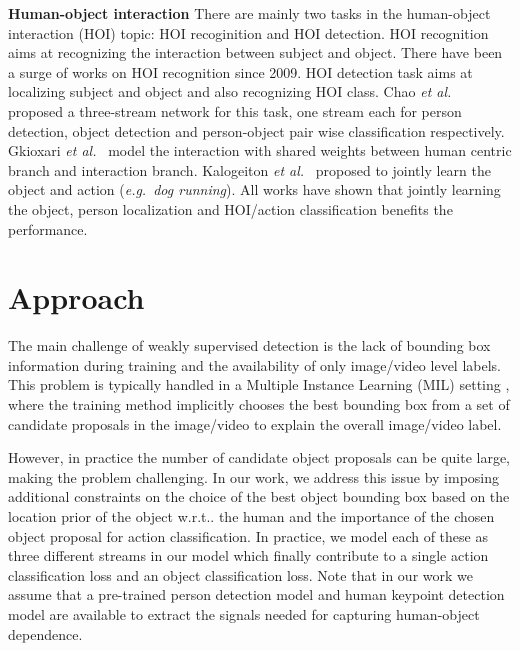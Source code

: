 \documentclass[10pt,twocolumn,letterpaper]{article}
\makeatletter
\DeclareRobustCommand\onedot{\futurelet\@let@token\@onedot}
\def\onedot{\ifx\@let@token.\else.\null\fi\xspace}
\def\eg{\emph{e.g.}}
\def\wrt{w.r.t\onedot}
\def\etal{\emph{et al.}}
\makeatother
\begin{document}
\textbf{Human-object interaction}
There are mainly two tasks in the human-object interaction (HOI) topic: HOI recoginition and HOI detection. HOI recognition aims at recognizing the interaction between subject and object. There have been a surge of works \cite{delaitre2010recognizing,gupta2009observing,yao2010modeling,shen2018scaling} on HOI recognition since 2009.
HOI detection task aims at localizing subject and object and also recognizing HOI class. Chao \etal~\cite{chao2018learning} proposed a three-stream network for this task, one stream each for person detection, object detection and person-object pair wise classification respectively. Gkioxari \etal~\cite{gkioxari2017detecting} model the interaction with shared weights between human centric branch and interaction branch. Kalogeiton \etal~\cite{kalogeiton2017joint} proposed to jointly learn the object and action (\eg~\textit{dog running}). All works have shown that jointly learning the object, person localization and HOI/action classification benefits the performance.
 \vspace{-0.5\baselineskip}
\section{Approach}
\vspace{-0.4\baselineskip}
\label{sec:approach}

The main challenge of weakly supervised detection is the lack of bounding box information during training and the availability of only image/video level labels. This problem is typically handled in a Multiple Instance Learning (MIL) setting \cite{bilen2016weakly,cinbis2017weakly}, where the training method implicitly chooses the best bounding box from a set of candidate proposals in the image/video to explain the overall image/video label.

However, in practice the number of candidate object proposals can be quite large, making the problem challenging. In our work, we address this issue by imposing additional constraints on the choice of the best object bounding box based on the location prior of the object \wrt the human and the importance of the chosen object proposal for action classification. In practice, we model each of these as three different streams in our model which finally contribute to a single action classification loss and an object classification loss. 
Note that in our work we assume that a pre-trained person detection model and human keypoint detection model are available to extract the signals needed for capturing human-object dependence.
\end{document}
